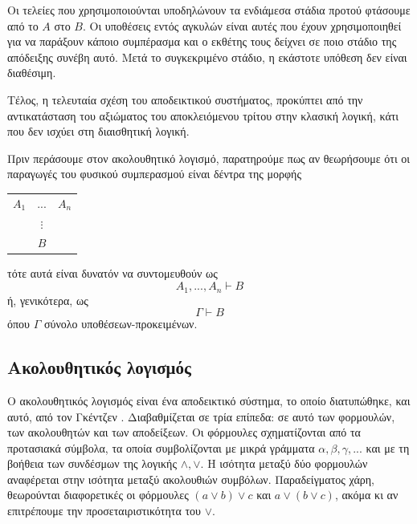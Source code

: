 \documentclass [a4paper,11pt] {book}
\theoremstyle{definition}
\theoremstyle{definition}
\begin{document}
Οι τελείες που χρησιμοποιούνται υποδηλώνουν τα ενδιάμεσα στάδια προτού φτάσουμε από το $A$ στο $B$. Οι υποθέσεις εντός αγκυλών είναι αυτές που έχουν χρησιμοποιηθεί για να παράξουν κάποιο συμπέρασμα και ο εκθέτης τους δείχνει σε ποιο στάδιο της απόδειξης συνέβη αυτό. Μετά το συγκεκριμένο στάδιο, η εκάστοτε υπόθεση δεν είναι διαθέσιμη. 

Τέλος, η τελευταία σχέση του αποδεικτικού συστήματος, προκύπτει από την αντικατάσταση του αξιώματος του αποκλειόμενου τρίτου στην κλασική λογική, κάτι που δεν ισχύει στη διαισθητική λογική.

Πριν περάσουμε στον ακολουθητικό λογισμό, παρατηρούμε πως αν θεωρήσουμε ότι οι παραγωγές του φυσικού συμπερασμού είναι δέντρα της μορφής
\begin{center}
\begin{tabular}{ccc}
$A_{1}$ & $...$ & $A_{n}$ \\
& $\vdots$ \\
& $B$
\end{tabular}
\end{center}
τότε αυτά είναι δυνατόν να συντομευθούν ως
\begin{equation*}
A_{1}, ..., A_{n} \vdash B
\end{equation*}
ή, γενικότερα, ως
\begin{equation*}
\Gamma \vdash B
\end{equation*}
όπου $\Gamma$ σύνολο υποθέσεων-προκειμένων.

\subsection{Ακολουθητικός λογισμός}
Ο ακολουθητικός λογισμός είναι ένα αποδεικτικό σύστημα, το οποίο διατυπώθηκε, και αυτό, από τον Γκέντζεν \citep{citeulike:869771}. Διαβαθμίζεται σε τρία επίπεδα: σε αυτό των φορμουλών, των ακολουθητών και των αποδείξεων. Οι φόρμουλες σχηματίζονται από τα προτασιακά σύμβολα, τα οποία συμβολίζονται με μικρά γράμματα $\alpha,\beta,\gamma,...$ και με τη βοήθεια των συνδέσμων της λογικής $\wedge,\vee$. Η ισότητα μεταξύ δύο φορμουλών αναφέρεται στην ισότητα μεταξύ ακολουθιών συμβόλων. Παραδείγματος χάρη, θεωρούνται διαφορετικές οι φόρμουλες $(a\vee b)\vee c$ και $a\vee (b\vee c)$, ακόμα κι αν επιτρέπουμε την προσεταιριστικότητα του $\vee$.
\end{document}
